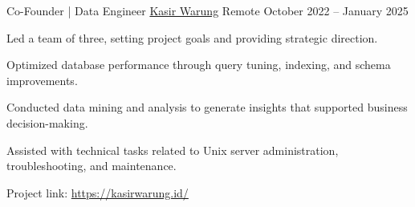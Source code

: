 


\begin{cventries}


\cventry
{Co-Founder | Data Engineer} %
{\href{https://kasirwarung.id/}{Kasir Warung}} %
{Remote} %
{October 2022 -- January 2025} %
{ %
\begin{cvitems}
\item {Led a team of three, setting project goals and providing strategic direction.}
\item {Optimized database performance through query tuning, indexing, and schema improvements.}
\item {Conducted data mining and analysis to generate insights that supported business decision-making.}
\item {Assisted with technical tasks related to Unix server administration, troubleshooting, and maintenance.}
\end{cvitems}
\vspace{4mm}
Project link: \href{https://kasirwarung.id/}{https://kasirwarung.id/}
}



\end{cventries}
